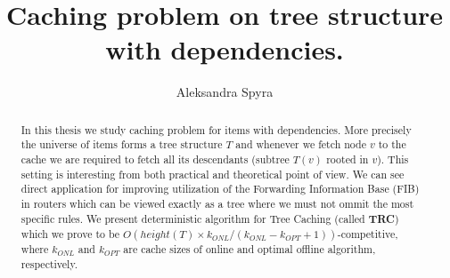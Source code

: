 \documentclass[a4paper,10pt]{article}
\title{Caching problem on tree structure with dependencies.}
\author{Aleksandra Spyra}
\begin{document}
\maketitle

\begin{abstract}
In this thesis we study caching problem for items with dependencies.
More precisely the universe of items forms a tree structure $T$ and whenever
we fetch node $v$ to the cache we are required to fetch all its descendants
(subtree $T(v)$ rooted in $v$). This setting is interesting from both practical 
and theoretical point of view. We can see direct application for improving 
utilization of the Forwarding Information Base (FIB) in routers which can be 
viewed exactly as a tree where we must not ommit the most specific rules. We 
present deterministic algorithm for Tree Caching (called \textbf{TRC}) which we 
prove to be $O(height(T) \times k_{ONL}/(k_{ONL} - k_{OPT} + 1))$-competitive, 
where $k_{ONL}$ and $k_{OPT}$ are cache sizes of online and optimal offline 
algorithm, respectively. 
\end{abstract}

\tableofcontents







\end{document}
